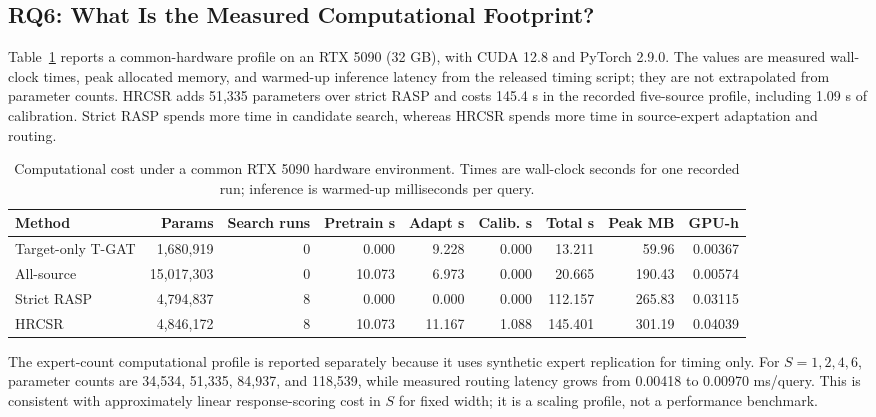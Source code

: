 \documentclass[journal]{IEEEtran}
\begin{document}
\subsection{RQ6: What Is the Measured Computational Footprint?}
Table~\ref{tab:efficiency} reports a common-hardware profile on an RTX 5090 (32 GB), with CUDA 12.8 and PyTorch 2.9.0. The values are measured wall-clock times, peak allocated memory, and warmed-up inference latency from the released timing script; they are not extrapolated from parameter counts. HRCSR adds 51,335 parameters over strict RASP and costs 145.4 s in the recorded five-source profile, including 1.09 s of calibration. Strict RASP spends more time in candidate search, whereas HRCSR spends more time in source-expert adaptation and routing.

\begin{table}[t]
\centering
\caption{Computational cost under a common RTX 5090 hardware environment. Times are wall-clock seconds for one recorded run; inference is warmed-up milliseconds per query.}
\label{tab:efficiency}
\scriptsize
\setlength{\tabcolsep}{3.2pt}
\begin{tabular}{lrrrrrrrr}
\toprule
\textbf{Method} & \textbf{Params} & \textbf{Search runs} & \textbf{Pretrain s} & \textbf{Adapt s} & \textbf{Calib. s} & \textbf{Total s} & \textbf{Peak MB} & \textbf{GPU-h} \\
\midrule
Target-only T-GAT & 1,680,919 & 0 & 0.000 & 9.228 & 0.000 & 13.211 & 59.96 & 0.00367 \\
All-source & 15,017,303 & 0 & 10.073 & 6.973 & 0.000 & 20.665 & 190.43 & 0.00574 \\
Strict RASP & 4,794,837 & 8 & 0.000 & 0.000 & 0.000 & 112.157 & 265.83 & 0.03115 \\
HRCSR & 4,846,172 & 8 & 10.073 & 11.167 & 1.088 & 145.401 & 301.19 & 0.04039 \\
\bottomrule
\end{tabular}
\end{table}

The expert-count computational profile is reported separately because it uses synthetic expert replication for timing only. For $S=1,2,4,6$, parameter counts are 34,534, 51,335, 84,937, and 118,539, while measured routing latency grows from 0.00418 to 0.00970 ms/query. This is consistent with approximately linear response-scoring cost in $S$ for fixed width; it is a scaling profile, not a performance benchmark.

\end{document}
